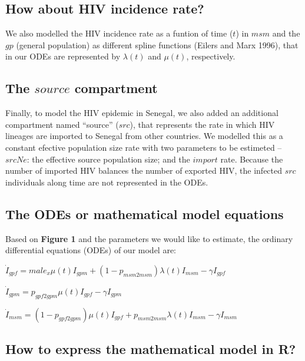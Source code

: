 \documentclass[12pt,]{article}
\begin{document}
\hypertarget{how-about-hiv-incidence-rate}{%
\subsection{How about HIV incidence
rate?}\label{how-about-hiv-incidence-rate}}

We also modelled the HIV incidence rate as a funtion of time (\(t\)) in
\(msm\) and the \(gp\) (general population) as different spline
functions (Eilers and Marx 1996), that in our ODEs are represented by
\(\lambda(t)\) and \(\mu(t)\), respectively.

\hypertarget{the-source-compartment}{%
\subsection{\texorpdfstring{The \(source\)
compartment}{The source compartment}}\label{the-source-compartment}}

Finally, to model the HIV epidemic in Senegal, we also added an
additional compartment named ``source'' (\(src\)), that represents the
rate in which HIV lineages are imported to Senegal from other countries.
We modelled this as a constant efective population size rate with two
parameters to be estimeted -- \(srcNe\): the effective source population
size; and the \(import\) rate. Because the number of imported HIV
balances the number of exported HIV, the infected \(src\) individuals
along time are not represented in the ODEs.

\hypertarget{the-odes-or-mathematical-model-equations}{%
\subsection{The ODEs or mathematical model
equations}\label{the-odes-or-mathematical-model-equations}}

Based on \textbf{Figure 1} and the parameters we would like to estimate,
the ordinary differential equations (ODEs) of our model are:

\(\dot{I}_{gpf} = male_x \mu(t) I_{gpm} + (1 - p_{msm2msm}) \lambda(t) I_{msm} - \gamma I_{gpf}\)

\(\dot{I}_{gpm} = p_{gpf2gpm} \mu(t) I_{gpf} - \gamma I_{gpm}\)

\(\dot{I}_{msm} = (1 - p_{gpf2gpm}) \mu(t) I_{gpf} + p_{msm2msm} \lambda(t) I_{msm} - \gamma I_{msm}\)

\hypertarget{how-to-express-the-mathematical-model-in-r}{%
\subsection{How to express the mathematical model in
R?}\label{how-to-express-the-mathematical-model-in-r}}
\end{document}
